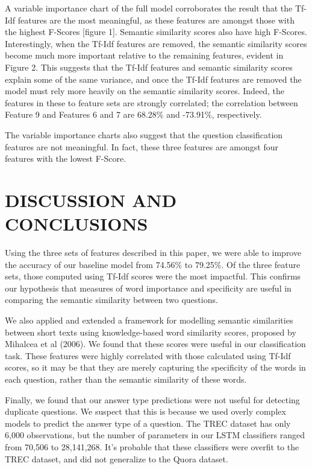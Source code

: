 \documentclass[letterpaper, 10 pt, conference]{ieeeconf}  %
\begin{document}
A variable importance chart of the full model corroborates the result that the Tf-Idf features are the most meaningful, as these features are amongst those with the highest F-Scores [figure 1]. Semantic similarity scores also have high F-Scores. Interestingly, when the Tf-Idf features are removed, the semantic similarity scores become much more important relative to the remaining features, evident in Figure 2. This suggests that the Tf-Idf features and semantic similarity scores explain some of the same variance, and once the Tf-Idf features are removed the model must rely more heavily on the semantic similarity scores. Indeed, the features in these to feature sets are strongly correlated; the correlation between Feature 9 and Features 6 and 7 are 68.28\% and -73.91\%, respectively. 

The variable importance charts also suggest that the question classification features are not meaningful. In fact, these three features are amongst four features with the lowest F-Score.


\section{DISCUSSION AND CONCLUSIONS}

Using the three sets of features described in this paper, we were able to improve the accuracy of our baseline model from 74.56\% to 79.25\%. Of the three feature sets, those computed using Tf-Idf scores were the most impactful. This confirms our hypothesis that measures of word importance and specificity are useful in comparing the semantic similarity between two questions. 

We also applied and extended a framework for modelling semantic similarities between short texts using knowledge-based word similarity scores, proposed by Mihalcea et al (2006). We found that these scores were useful in our classification task. These features were highly correlated with those calculated using Tf-Idf scores, so it may be that they are merely capturing the specificity of the words in each question, rather than the semantic similarity of these words. 

Finally, we found that our answer type predictions were not useful for detecting duplicate questions. We suspect that this is because we used overly complex models to predict the answer type of a question. The TREC dataset has only 6,000 observations, but the number of parameters in our LSTM classifiers ranged from 70,506 to 28,141,268. It's probable that these classifiers were overfit to the TREC dataset, and did not generalize to the Quora dataset. 
\end{document}
